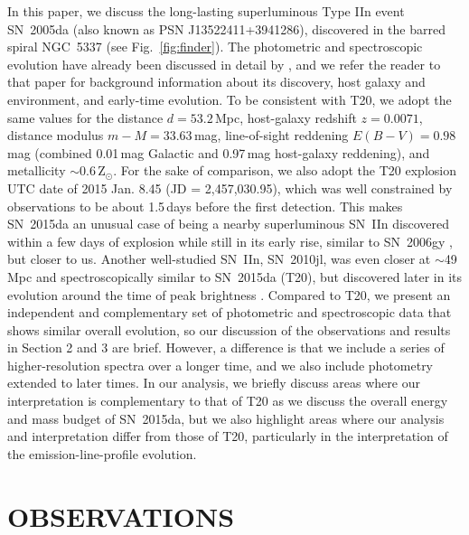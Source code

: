 \documentclass[fleqn,usenatbib,useAMS]{mnras}
\begin{document}
In this paper, we discuss the long-lasting superluminous Type IIn event SN~2005da (also known as PSN J13522411+3941286), discovered in the barred spiral NGC~5337 (see Fig.~\ref{fig:finder}).  The photometric and spectroscopic evolution have already been discussed in detail by \citet[][T20 hereafter]{tar20}, and we refer the reader to that paper for background information about its discovery, host galaxy and environment, and early-time evolution.  To be consistent with T20, we adopt the same values for the distance $d=53.2$\,Mpc, host-galaxy redshift $z=0.0071$, distance modulus $m-M=33.63$\,mag, line-of-sight reddening $E(B-V)=0.98$\,mag (combined 0.01\,mag Galactic and 0.97\,mag host-galaxy reddening), and metallicity $\sim 0.6$\,Z$_{\odot}$.  For the sake of comparison, we also adopt the T20 explosion UTC date of 2015 Jan. 8.45 (JD = 2,457,030.95), which was well constrained by observations to be about 1.5\,days before the first detection.  This makes SN~2015da an unusual case of being a nearby superluminous SN~IIn discovered within a few days of explosion while still in its early rise, similar to SN~2006gy \citep{smith07}, but closer to us.  Another well-studied SN~IIn, SN~2010jl, was even closer at $\sim$49\,Mpc \citep{smith11} and spectroscopically similar to SN~2015da (T20), but discovered later in its evolution around the time of peak brightness \citep{stoll11}.  Compared to T20, we present an independent and complementary set of photometric and spectroscopic data that shows similar overall evolution, so our discussion of the observations and results in Section 2 and 3 are brief.  However, a difference is that we include a series of higher-resolution spectra over a longer time, and we also include photometry extended to later times.  In our analysis, we briefly discuss areas where our interpretation is complementary to that of T20 as we discuss the overall energy and mass budget of SN~2015da, but we also highlight areas where our analysis and interpretation differ from those of T20, particularly in the interpretation of the emission-line-profile evolution.   



\section{OBSERVATIONS}
\end{document}
